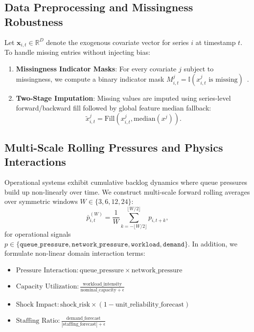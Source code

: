\documentclass[11pt,a4paper]{article}
\begin{document}
\subsection{Data Preprocessing and Missingness Robustness}
Let $\mathbf{x}_{i,t} \in \mathbb{R}^D$ denote the exogenous covariate vector for series $i$ at timestamp $t$. To handle missing entries without injecting bias:
\begin{enumerate}
    \item \textbf{Missingness Indicator Masks}: For every covariate $j$ subject to missingness, we compute a binary indicator mask $M_{i,t}^j = \mathbb{I}(x_{i,t}^j \text{ is missing})$~\cite{che2018missing}.
    \item \textbf{Two-Stage Imputation}: Missing values are imputed using series-level forward/backward fill followed by global feature median fallback:
    \begin{equation}
        \tilde{x}_{i,t}^j = \text{Fill}\left(x_{i,t}^j, \text{median}(x^j)\right).
    \end{equation}
\end{enumerate}

\subsection{Multi-Scale Rolling Pressures and Physics Interactions}
Operational systems exhibit cumulative backlog dynamics where queue pressures build up non-linearly over time. We construct multi-scale forward rolling averages over symmetric windows $W \in \{3, 6, 12, 24\}$:
\begin{equation}
    \bar{p}_{i,t}^{(W)} = \frac{1}{W} \sum_{k=-\lfloor W/2 \rfloor}^{\lfloor W/2 \rfloor} p_{i, t+k},
\end{equation}
for operational signals $p \in \{\texttt{queue\_pressure}, \texttt{network\_pressure}, \texttt{workload}, \texttt{demand}\}$. In addition, we formulate non-linear domain interaction terms:
\begin{itemize}
    \item $\text{Pressure Interaction}: \text{queue\_pressure} \times \text{network\_pressure}$
    \item $\text{Capacity Utilization}: \frac{\text{workload\_intensity}}{\text{nominal\_capacity} + \epsilon}$
    \item $\text{Shock Impact}: \text{shock\_risk} \times (1 - \text{unit\_reliability\_forecast})$
    \item $\text{Staffing Ratio}: \frac{\text{demand\_forecast}}{|\text{staffing\_forecast}| + \epsilon}$
\end{itemize}
\end{document}
